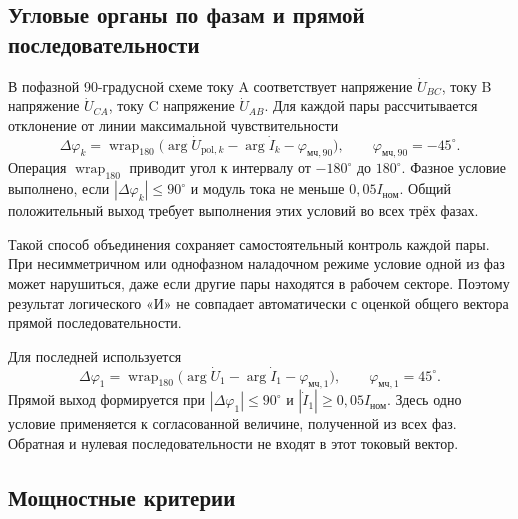 \subsection{Угловые органы по фазам и прямой последовательности}
\label{sec:ch5_angular_organs}

В пофазной 90-градусной схеме
току A соответствует напряжение
$\dot{U}_{BC}$, току B напряжение
$\dot{U}_{CA}$, току C напряжение
$\dot{U}_{AB}$.
Для каждой пары рассчитывается
отклонение от линии максимальной
чувствительности
\begin{equation}
 \Delta\varphi_k=
 \operatorname{wrap}_{180}
 \bigl(\arg\dot{U}_{\mathrm{pol},k}
       -\arg\dot{I}_k-\varphi_{\text{мч},90}\bigr),
 \qquad \varphi_{\text{мч},90}=-45^\circ.
 \label{eq:ch5_phase_angle}
\end{equation}
Операция $\operatorname{wrap}_{180}$
приводит угол к интервалу
от $-180^\circ$ до $180^\circ$.
Фазное условие выполнено,
если $|\Delta\varphi_k|\le90^\circ$
и модуль тока не меньше
$0{,}05I_{\text{ном}}$.
Общий положительный выход требует
выполнения этих условий
во всех трёх фазах.

Такой способ объединения сохраняет
самостоятельный контроль каждой пары.
При несимметричном или однофазном
наладочном режиме условие одной
из фаз может нарушиться,
даже если другие пары находятся
в рабочем секторе.
Поэтому результат логического «И»
не совпадает автоматически
с оценкой общего вектора
прямой последовательности.

Для последней используется
\begin{equation}
 \Delta\varphi_1=
 \operatorname{wrap}_{180}
 \bigl(\arg\dot{U}_1-\arg\dot{I}_1
       -\varphi_{\text{мч},1}\bigr),
 \qquad \varphi_{\text{мч},1}=45^\circ.
 \label{eq:ch5_pos_angle}
\end{equation}
Прямой выход формируется
при $|\Delta\varphi_1|\le90^\circ$
и $|\dot{I}_1|\ge0{,}05I_{\text{ном}}$.
Здесь одно условие применяется
к согласованной величине,
полученной из всех фаз.
Обратная и нулевая последовательности
не входят в этот токовый вектор.

\subsection{Мощностные критерии}
\label{sec:ch5_power_organs}

